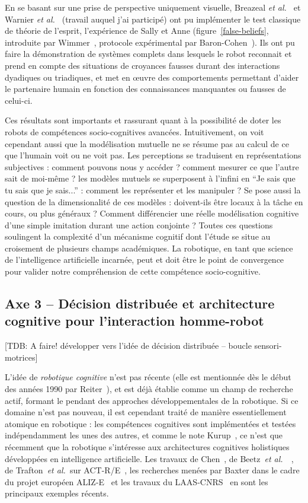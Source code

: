 \documentclass[a4paper]{article}
\newcommand{\etal}{{\textit{et al.~}}}
\begin{document}
En se basant sur une prise de perspective uniquement visuelle, Breazeal
\etal\cite{breazeal2009embodied} et Warnier \etal\cite{warnier2012when} (travail
auquel j'ai participé) ont pu implémenter le test classique de théorie de
l'esprit, l'expérience de Sally et Anne (figure~\ref{false-beliefs}, introduite
par Wimmer~\cite{wimmer1983beliefs}, protocole expérimental par
Baron-Cohen~\cite{baron1985does}). Ils ont pu faire la démonstration de systèmes
complets dans lesquels le robot reconnait et prend en compte des
situations de croyances fausses durant des interactions dyadiques ou triadiques,
et met en \oe uvre des comportements permettant d'aider le partenaire humain en
fonction des connaissances manquantes ou fausses de celui-ci.

Ces résultats sont importants et rassurant quant à la possibilité de doter les
robots de compétences socio-cognitives avancées. Intuitivement, on voit
cependant aussi que la modélisation mutuelle ne se résume pas au calcul de ce
que l'humain voit ou ne voit pas. Les perceptions se traduisent en
représentations subjectives : comment pouvons nous y accéder ? comment mesurer
ce que l'autre sait de moi-même ? les modèles mutuels se superposent à l'infini
en ``Je sais que tu sais que je sais...'' : comment les représenter et
les manipuler ? Se pose aussi la question de la dimensionalité de ces modèles :
doivent-ils être locaux à la tâche en cours, ou plus généraux ? Comment
différencier une réelle modélisation cognitive d'une simple imitation durant une
action conjointe ? Toutes ces questions soulingent la complexité d'un mécanisme
cognitif dont l'étude se situe au croisement de plusieurs champs académiques. La
robotique, en tant que science de l'intelligence artificielle incarnée, peut et
doit être le point de convergence pour valider notre compréhension de cette
compétence socio-cognitive.

\subsection*{Axe 3 -- Décision distribuée et architecture cognitive pour l'interaction homme-robot}

[TDB: A faire! développer vers l'idée de décision distribuée -- boucle
sensori-motrices]

L'idée de \emph{robotique cognitive} n'est pas récente (elle est mentionnée dès
le début des années 1990 par Reiter~\cite{Levesque2008}), et est déjà établie
comme un champ de recherche actif, formant le pendant des approches
développementales de la robotique. Si ce domaine n'est pas nouveau, il est
cependant traité de manière essentiellement atomique en robotique : les
compétences cognitives sont implémentées et testées indépendamment les unes des
autres, et comme le note Kurup~\cite{kurup2012what}, ce n'est que récemment que
la robotique s'intéresse aux architectures cognitives holistiques développées en
intelligence artificielle. Les travaux de Chen~\cite{Chen2010}, de
Beetz~\etal~\cite{Beetz2010}, de Trafton~\etal sur
ACT-R/E~\cite{trafton2013act}, les recherches menées par Baxter dans le cadre du
projet européen ALIZ-E~\cite{baxter2013cognitive} et les travaux du
LAAS-CNRS~\cite{lemaignan2014human} en sont les principaux exemples récents.
\end{document}
